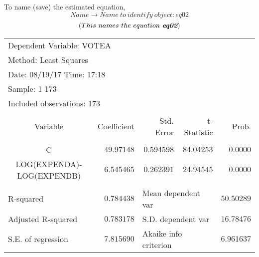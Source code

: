 \documentclass[12pt]{report}
\begin{document}
\noindent To name (save) the estimated equation,
$$Name \to Name\ to\ identify\ object: eq02$$
$$(This\ names\ the\ equation\ \textit{\textbf{eq02}})$$
\begin{figure}[H]
	\centering
\end{figure}
\vspace{-\baselineskip}
\begin{figure}[H]
	\centering
\end{figure}
\vspace{-\baselineskip}
\begin{table}[H]
	\centering
	\begin{tabular}{lrrrr}
		\multicolumn{3}{l}{Dependent Variable: VOTEA}&\multicolumn{1}{c}{}&\multicolumn{1}{c}{}\\
		\multicolumn{3}{l}{Method: Least Squares}&\multicolumn{1}{c}{}&\multicolumn{1}{c}{}\\
		\multicolumn{3}{l}{Date: 08/19/17   Time: 17:18}&\multicolumn{1}{c}{}&\multicolumn{1}{c}{}\\
		\multicolumn{2}{l}{Sample: 1 173}&\multicolumn{1}{c}{}&\multicolumn{1}{c}{}&\multicolumn{1}{c}{}\\
		\multicolumn{3}{l}{Included observations: 173}&\multicolumn{1}{c}{}&\multicolumn{1}{c}{}\\
		[4.5pt] \hline \\ [-4.5pt]
		\multicolumn{1}{c}{Variable}&\multicolumn{1}{r}{Coefficient}&\multicolumn{1}{r}{Std. Error}&\multicolumn{1}{r}{t-Statistic}&\multicolumn{1}{r}{Prob.}\\
		[4.5pt] \hline \\ [-4.5pt]
		\multicolumn{1}{c}{C}&\multicolumn{1}{r}{$49.97148$}&\multicolumn{1}{r}{$0.594598$}&\multicolumn{1}{r}{$84.04253$}&\multicolumn{1}{r}{$0.0000$}\\
		\multicolumn{1}{c}{LOG(EXPENDA)-LOG(EXPENDB)}&\multicolumn{1}{r}{$6.545465$}&\multicolumn{1}{r}{$0.262391$}&\multicolumn{1}{r}{$24.94545$}&\multicolumn{1}{r}{$0.0000$}\\
		[4.5pt] \hline \\ [-4.5pt]
		\multicolumn{1}{l}{R-squared}&\multicolumn{1}{r}{$0.784438$}&\multicolumn{2}{l}{Mean dependent var}&\multicolumn{1}{r}{$50.50289$}\\
		\multicolumn{1}{l}{Adjusted R-squared}&\multicolumn{1}{r}{$0.783178$}&\multicolumn{2}{l}{S.D. dependent var}&\multicolumn{1}{r}{$16.78476$}\\
		\multicolumn{1}{l}{S.E. of regression}&\multicolumn{1}{r}{$7.815690$}&\multicolumn{2}{l}{Akaike info criterion}&\multicolumn{1}{r}{$6.961637$}\\

\end{tabular}
\end{table}
\end{document}
